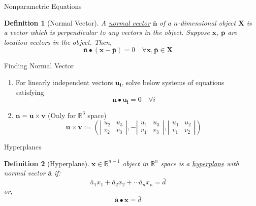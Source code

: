 \documentclass[final]{beamer}
\newtheorem{defn}{Definition}
\begin{document}
\begin{frame}[t]{Nonparametric Equations}
	\begin{defn}
		[Normal Vector]
		A \uline{normal vector} $\bar{\mathbf{n}}$ of a $n$-dimensional object $\mathbf{X}$ is a vector which is perpendicular to any vectors in the object. Suppose $\mathbf{x}$, $\bar{\mathbf{p}}$ are location vectors in the object. Then, \[
			\bar{\mathbf{n}}\bullet(\mathbf{x}-\bar{\mathbf{p}})=0\quad \forall \mathbf{x,\bar{p}}\in\mathbf{X}
		\]
	\end{defn}
	\begin{block}
		{Finding Normal Vector}
		\begin{enumerate}
			\item For linearly independent vectors $\mathbf{u_i}$, solve below systems of equations satisfying \[
				\mathbf{n}\bullet\mathbf{u_i}=0 \quad\forall i
			\] 
			\item $\mathbf{n}=\mathbf{u} \times \mathbf{v}$ (Only for $\mathbb{R}^3$ space)
			\[
				\mathbf{u} \times \mathbf{v} := \left(\left|\begin{matrix}
					u_2 & u_3 \\ v_2 & v_3
				\end{matrix}\right|,-\left|\begin{matrix}
					u_1&u_3\\ v_1 & v_3 
				\end{matrix}\right|,\left|\begin{matrix}
					u_1&u_2\\v_1&v_2
				\end{matrix}\right|\right)
			\]
		\end{enumerate}
	\end{block}
\end{frame}

\begin{frame}[t]{Hyperplanes}
	\begin{defn}
		[Hyperplane]
		$\mathbf{x}\in\mathbb{R}^{n-1}$ object in $\mathbb{R}^n$ space is a \uline{hyperplane} with normal vector $\bar{\mathbf{a}}$ if:\[
			\bar{a}_1 x_1+\bar{a}_2 x_2+\cdots\bar{a}_n x_n = \bar d
		\]or, \[
			\bar{\mathbf{a}}\bullet\mathbf{x}=\bar d
		\]
	\end{defn}
\end{frame}
\end{document}
